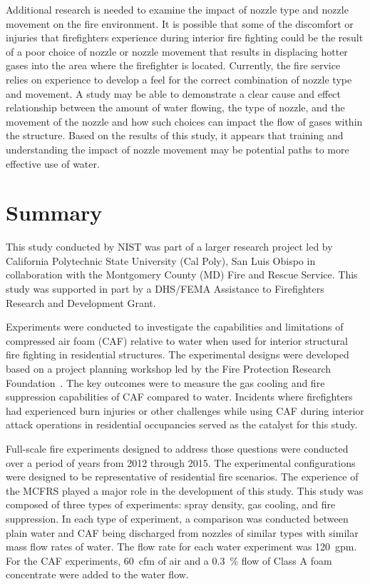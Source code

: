 \documentclass[12pt,oneside]{book}
\begin{document}
Additional research is needed to examine the impact of nozzle type and nozzle movement on the fire environment. It is possible that some of the discomfort or injuries that firefighters experience during interior fire fighting could be the result of a poor choice of nozzle or nozzle movement that results in displacing hotter gases into the area where the firefighter is located. Currently, the fire service relies on experience to develop a feel for the correct combination of nozzle type and movement. A study may be able to demonstrate a clear cause and effect relationship between the amount of water flowing, the type of nozzle, and the movement of the nozzle and how such choices can impact the flow of gases within the structure. Based on the results of this study, it appears that training and understanding the impact of nozzle movement may be potential paths to more effective use of water. 

\chapter{Summary}
\label{chap:Summary}

This study conducted by NIST was part of a larger research project led by California Polytechnic State University (Cal Poly), San Luis Obispo in collaboration with the Montgomery County (MD) Fire and Rescue Service. This study was supported in part by a DHS/FEMA Assistance to Firefighters Research and Development Grant.  

Experiments were conducted to investigate the capabilities and limitations of compressed air foam (CAF) relative to water when used for interior structural fire fighting in residential structures. The experimental designs were developed based on a project planning workshop led by the Fire Protection Research Foundation~\cite{Grant:2011}. The key outcomes were to measure the gas cooling and fire suppression capabilities of CAF compared to water. Incidents where firefighters had experienced burn injuries or other challenges while using CAF during interior attack operations in residential occupancies served as the catalyst for this study.

Full-scale fire experiments designed to address those questions were conducted over a period of years from 2012 through 2015. The experimental configurations were designed to be representative of residential fire scenarios.  The experience of the MCFRS played a major role in the development of this study.  %
This study was composed of three types of experiments: spray density, gas cooling, and fire suppression. In each type of experiment, a comparison was conducted between plain water and CAF being discharged from nozzles of similar types with similar mass flow rates of water. The flow rate for each water experiment was 120~gpm. For the CAF experiments, 60~cfm of air and a 0.3~\% flow of Class A foam concentrate were added to the water flow.
\end{document}
